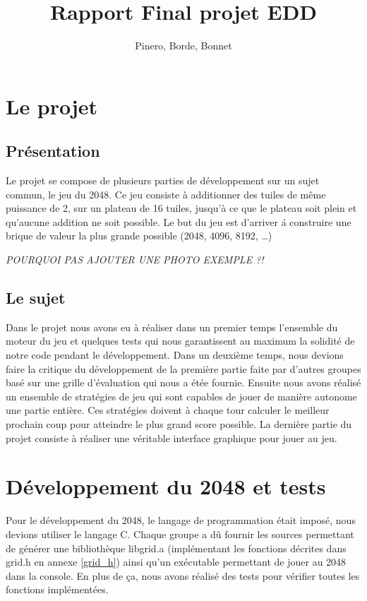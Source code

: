 \documentclass[12pt]{article}
\title{Rapport Final projet EDD}
\author{Pinero, Borde, Bonnet}
\begin{document}
\maketitle
\tableofcontents

\newpage

\section{Le projet}
\subsection{Pr\'esentation}
Le projet se compose de plusieurs parties de d\'eveloppement sur un sujet
commun, le jeu du 2048. Ce jeu consiste \`a additionner des tuiles de m\^eme
puissance de 2, sur un plateau de 16 tuiles, jusqu'\`a ce que le plateau soit
plein et qu'aucune addition ne soit possible. Le but du jeu est d’arriver \'a
construire une brique de valeur la plus grande possible (2048, 4096,
8192, \ldots)
\par 
\emph{\color{red}POURQUOI PAS AJOUTER UNE PHOTO EXEMPLE ?!}
\subsection{Le sujet}
Dans le projet nous avons eu \`a r\'ealiser dans un premier temps l'ensemble du
moteur du jeu et quelques tests qui nous garantissent au maximum la solidité de notre code 
pendant le d\'eveloppement. Dans un deuxi\`eme temps, nous devions faire la
\og critique \fg{} du développement de la premi\`ere partie faite par
d'autres groupes bas\'e sur une grille d'évaluation qui nous a \'et\'ee
fournie. Ensuite nous avons r\'ealisé un ensemble de strat\'egies de jeu qui
sont capables de jouer de mani\`ere autonome une partie enti\`ere. Ces strat\'egies doivent \`a chaque tour calculer le meilleur
prochain coup pour atteindre le plus grand score possible. La derni\`ere partie
du projet consiste \`a r\'ealiser une v\'eritable interface graphique pour
jouer au jeu.

\newpage
\section{D\'eveloppement du 2048 et tests}
Pour le d\'eveloppement du 2048, le langage de programmation \'etait impos\'e,
nous devions utiliser le langage C. Chaque groupe a d\^u fournir les sources
permettant de g\'en\'erer une biblioth\`eque libgrid.a (impl\'ementant les
fonctions décrites dans grid.h en annexe \ref{grid_h}) ainsi qu’un
ex\'ecutable permettant de jouer au 2048 dans la console. En plus de ça, nous
avons r\'ealis\'e des tests pour v\'erifier toutes les fonctions
impl\'ement\'ees.\par
\end{document}

